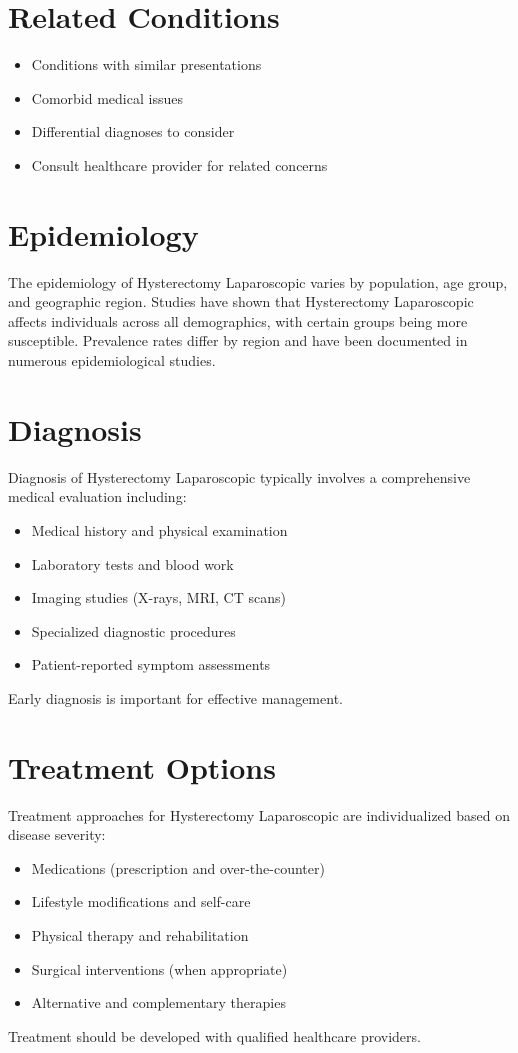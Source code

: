 \section*{Related Conditions}
\begin{itemize}
  \item Conditions with similar presentations
  \item Comorbid medical issues
  \item Differential diagnoses to consider
  \item Consult healthcare provider for related concerns
\end{itemize}

\section*{Epidemiology}
The epidemiology of Hysterectomy Laparoscopic varies by population, age group, and geographic region. Studies have shown that Hysterectomy Laparoscopic affects individuals across all demographics, with certain groups being more susceptible. Prevalence rates differ by region and have been documented in numerous epidemiological studies.

\section*{Diagnosis}
Diagnosis of Hysterectomy Laparoscopic typically involves a comprehensive medical evaluation including:
\begin{itemize}
  \item Medical history and physical examination
  \item Laboratory tests and blood work
  \item Imaging studies (X-rays, MRI, CT scans)
  \item Specialized diagnostic procedures
  \item Patient-reported symptom assessments
\end{itemize}
Early diagnosis is important for effective management.

\section*{Treatment Options}
Treatment approaches for Hysterectomy Laparoscopic are individualized based on disease severity:
\begin{itemize}
  \item Medications (prescription and over-the-counter)
  \item Lifestyle modifications and self-care
  \item Physical therapy and rehabilitation
  \item Surgical interventions (when appropriate)
  \item Alternative and complementary therapies
\end{itemize}
Treatment should be developed with qualified healthcare providers.

